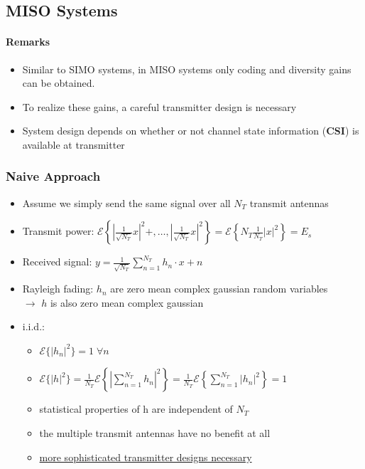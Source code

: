 \documentclass[a4paper, 10pt]{article}
\begin{document}
\subsection{MISO Systems}
\paragraph{Remarks}
	\begin{itemize}
		\item Similar to SIMO systems, in MISO systems only coding and diversity gains can be obtained.
		\item To realize these gains, a careful transmitter design is necessary
		\item System design depends on whether or not channel state information (\textbf{CSI}) is available at transmitter
	\end{itemize}
\subsubsection{Naive Approach}
\begin{itemize}	
	\item Assume we simply send the same signal over all $N_T$ transmit antennas
\end{itemize}

\begin{itemize}
	\item Transmit power: $\mathcal{E}\left\{\left|\frac{1}{\sqrt{N_T}}x\right|^2+,\dots,\left|\frac{1}{\sqrt{N_T}}x\right|^2\right\}=\mathcal{E}\left\{N_T\frac{1}{N_T}|x|^2\right\}=E_s$
	\item Received signal: $y=\frac{1}{\sqrt{N_T}}\sum\limits_{n=1}^{N_T}h_n\cdot x+n$
	\item Rayleigh fading: $h_n$ are zero mean complex gaussian random variables\\
	$\rightarrow$ $h$ is also zero mean complex gaussian
	\item i.i.d.:
	\begin{itemize}
		\item $\mathcal{E}\{|h_n|^2\}=1\;\forall n$
		\item $\mathcal{E}\{|h|^2\}=\frac{1}{N_T}\mathcal{E}\left\{\left|\sum\limits_{n=1}^{N_T}h_n\right|^2\right\}=\frac{1}{N_T}\mathcal{E}\left\{\sum\limits^{N_T}_{n=1}|h_n|^2\right\}=1$
		\item statistical properties of h are independent of $N_T$
		\item the multiple transmit antennas have no benefit at all
		\item \underline{more sophisticated transmitter designs necessary}
	\end{itemize}
\end{itemize}
\end{document}
